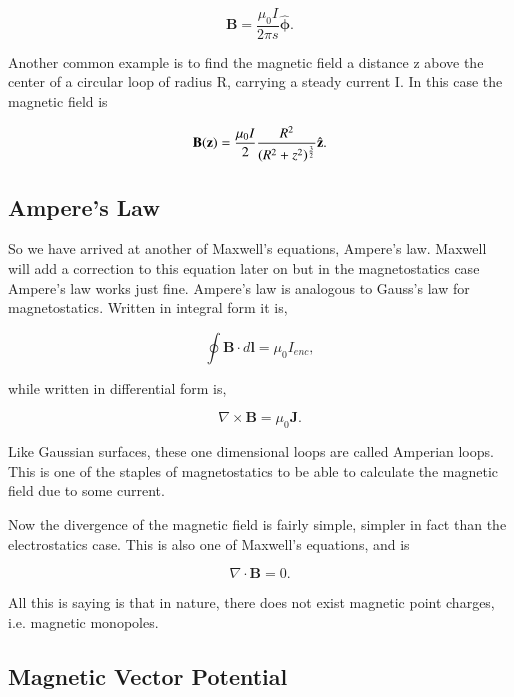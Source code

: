 \documentclass[preprint, review,12pt]{elsarticle}
\def\x{\times}
\def\.{\cdot}
\def\b{\textbf}
\begin{document}
\begin{equation}
    \b{B} = \frac{\mu_0I}{2\pi s}\hat{\bm\phi}.
\end{equation}

Another common example is to find the magnetic field a distance z above the center of a circular loop of radius R, carrying a steady current I. In this case the magnetic field is

\begin{equation}
    \b{B}(\b{z}) = \frac{\mu_0I}{2} \frac{R^2}{(R^2+z^2)^\frac{3}{2}}\hat{\b z}.
\end{equation}

\subsection{Ampere's Law}

So we have arrived at another of Maxwell's equations, Ampere's law. Maxwell will add a correction to this equation later on but in the magnetostatics case Ampere's law works just fine. Ampere's law is analogous to Gauss's law for magnetostatics. Written in integral form it is,

\begin{equation}
    \oint \b{B} \. d\b{l} = \mu_0 I_{enc},
\end{equation}

while written in differential form is,

\begin{equation}
    \nabla \x \b{B} = \mu_0 \b{J}.
\end{equation}

Like Gaussian surfaces, these one dimensional loops are called Amperian loops. This is one of the staples of magnetostatics to be able to calculate the magnetic field due to some current. 

Now the divergence of the magnetic field is fairly simple, simpler in fact than the electrostatics case. This is also one of Maxwell's equations, and is

\begin{equation}
    \nabla \. \b{B} = 0.
\end{equation}

All this is saying is that in nature, there does not exist magnetic point charges, i.e. magnetic monopoles. 

\subsection{Magnetic Vector Potential}
\end{document}
